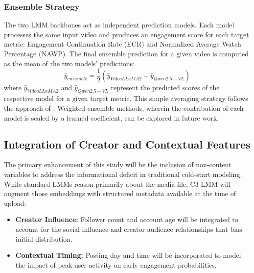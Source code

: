 
\subsubsection{Ensemble Strategy}

The two LMM backbones act as independent prediction models. Each model processes the same input video and produces an engagement score for each target metric: Engagement Continuation Rate (ECR) and Normalized Average Watch Percentage (NAWP). The final ensemble prediction for a given video is computed as the mean of the two models' predictions:
\begin{equation}
    \hat{y}_{ensemble} = \frac12(\hat{y}_{VideoLLaMA2} + \hat{y}_{Qwen2.5-VL})
\end{equation}
where $\hat{y}_{VideoLLaMA2}$ and $\hat{y}_{Qwen2.5-VL}$ represent the predicted scores of the respective model for a given target metric. This simple averaging strategy follows the approach of \cite{sun2025engagement}. Weighted ensemble methods, wherein the contribution of each model is scaled by a learned coefficient, can be explored in future work.

\subsection{Integration of Creator and Contextual Features}
\label{sec:feature_integration}

The primary enhancement of this study will be the inclusion of non-content variables to address the informational deficit in traditional cold-start modeling. While standard LMMs reason primarily about the media file, C3-LMM will augment those embeddings with structured metadata available at the time of upload:
\begin{itemize}
    \item \textbf{Creator Influence:} Follower count and account age will be integrated to account for the social influence and creator-audience relationships that bias initial distribution.
    \item \textbf{Contextual Timing:} Posting day and time will be incorporated to model the impact of peak user activity on early engagement probabilities.
\end{itemize}

